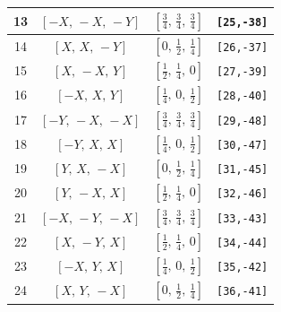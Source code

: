 \documentclass[fleqn,8pt]{jsarticle}
\begin{document}
\begin{longtable}{cccc}
13 & $\left[ - X,\, - X,\, - Y \right]$ & $\left[ \frac{3}{4},\, \frac{3}{4},\, \frac{3}{4} \right]$ & {\tt [25,-38]} \\ \hline
14 & $\left[ X,\, X,\, - Y \right]$ & $\left[ 0,\, \frac{1}{2},\, \frac{1}{4} \right]$ & {\tt [26,-37]} \\ \hline
15 & $\left[ X,\, - X,\, Y \right]$ & $\left[ \frac{1}{2},\, \frac{1}{4},\, 0 \right]$ & {\tt [27,-39]} \\ \hline
16 & $\left[ - X,\, X,\, Y \right]$ & $\left[ \frac{1}{4},\, 0,\, \frac{1}{2} \right]$ & {\tt [28,-40]} \\ \hline
17 & $\left[ - Y,\, - X,\, - X \right]$ & $\left[ \frac{3}{4},\, \frac{3}{4},\, \frac{3}{4} \right]$ & {\tt [29,-48]} \\ \hline
18 & $\left[ - Y,\, X,\, X \right]$ & $\left[ \frac{1}{4},\, 0,\, \frac{1}{2} \right]$ & {\tt [30,-47]} \\ \hline
19 & $\left[ Y,\, X,\, - X \right]$ & $\left[ 0,\, \frac{1}{2},\, \frac{1}{4} \right]$ & {\tt [31,-45]} \\ \hline
20 & $\left[ Y,\, - X,\, X \right]$ & $\left[ \frac{1}{2},\, \frac{1}{4},\, 0 \right]$ & {\tt [32,-46]} \\ \hline
21 & $\left[ - X,\, - Y,\, - X \right]$ & $\left[ \frac{3}{4},\, \frac{3}{4},\, \frac{3}{4} \right]$ & {\tt [33,-43]} \\ \hline
22 & $\left[ X,\, - Y,\, X \right]$ & $\left[ \frac{1}{2},\, \frac{1}{4},\, 0 \right]$ & {\tt [34,-44]} \\ \hline
23 & $\left[ - X,\, Y,\, X \right]$ & $\left[ \frac{1}{4},\, 0,\, \frac{1}{2} \right]$ & {\tt [35,-42]} \\ \hline
24 & $\left[ X,\, Y,\, - X \right]$ & $\left[ 0,\, \frac{1}{2},\, \frac{1}{4} \right]$ & {\tt [36,-41]} \\
\end{longtable}
\renewcommand{\arraystretch}{1.2}
\end{document}
